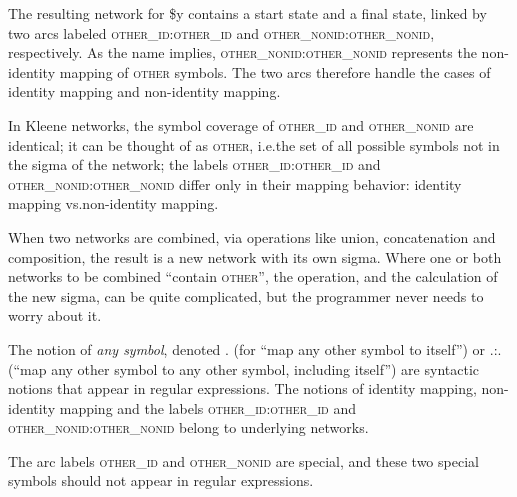 \documentclass[letterpaper,12pt]{article}
\newcommand{\acro}{\textsc}
\begin{document}
\noindent
The resulting network for \$y contains a start state and a final state,
linked by two arcs labeled \acro{other\_id}:\acro{other\_id} and
\acro{other\_nonid}:\acro{other\_nonid}, respectively.  As the name
implies, \acro{other\_nonid}:\acro{other\_nonid} represents the
non-identity mapping of \acro{other} symbols.  The two arcs therefore
handle the cases of identity mapping and non-identity mapping.

In Kleene networks, the symbol coverage of \acro{other\_id} and
\acro{other\_nonid} are identical; it can be thought of as \acro{other},
i.e.\@ the set of all possible symbols not in the sigma of the network;
the labels \acro{other\_id}:\acro{other\_id} and
\acro{other\_nonid}:\acro{other\_nonid} differ only in their mapping
behavior: identity mapping vs.\@ non-identity mapping.

When two networks are combined, via operations like union, concatenation
and composition, the result is a new network with its own sigma.  Where
one or both networks to be combined ``contain \acro{other}'', the
operation, and the calculation of the new sigma, can be quite
complicated, but the programmer never needs to worry about it.

The notion of \emph{any symbol}, denoted . (for ``map any other symbol to
itself'') or .:. (``map any other symbol to any other symbol, including
itself'') are syntactic notions that appear in regular expressions.  The
notions of identity mapping, non-identity mapping and the labels
\acro{other\_id}:\acro{other\_id} and
\acro{other\_nonid}:\acro{other\_nonid} belong to underlying networks.  

The arc labels \acro{other\_id} and \acro{other\_nonid} are special, and
these two special symbols should not appear in regular expressions.

%
%
%
\end{document}
